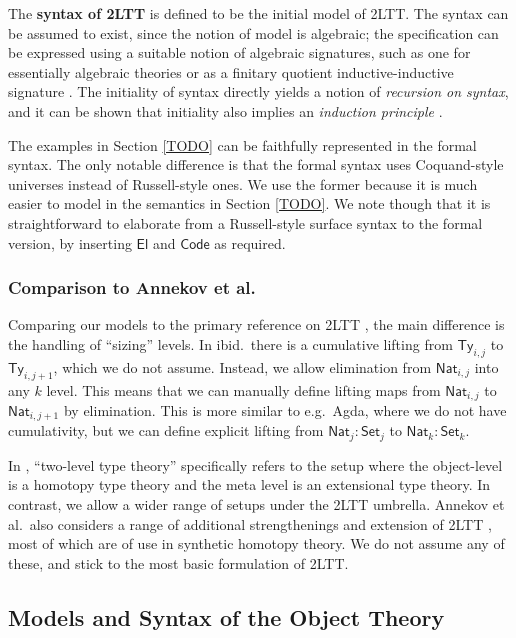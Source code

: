 \documentclass[acmsmall]{acmart}
\newcommand{\msf}[1]{\mathsf{#1}}
\newcommand{\Code}{\msf{Code}}
\newcommand{\El}{\msf{El}}
\newcommand{\Ty}{\msf{Ty}}
\newcommand{\Nat}{\msf{Nat}}
\newcommand{\Set}{\mathsf{Set}}
\theoremstyle{remark}
\begin{document}
\begin{definition}
The \textbf{syntax of 2LTT} is defined to be the initial model of 2LTT. The syntax
can be assumed to exist, since the notion of model is algebraic; the
specification can be expressed using a suitable notion of algebraic signatures,
such as one for essentially algebraic theories \cite{TODO} or as a finitary
quotient inductive-inductive signature \cite{TODO}. The initiality of syntax
directly yields a notion of \emph{recursion on syntax}, and it can be shown that
initiality also implies an \emph{induction principle} \cite{TODO}.
\end{definition}

The examples in Section \ref{TODO} can be faithfully represented in the formal
syntax. The only notable difference is that the formal syntax uses Coquand-style
universes instead of Russell-style ones. We use the former because it is much
easier to model in the semantics in Section \ref{TODO}. We note though that it
is straightforward to elaborate from a Russell-style surface syntax to the
formal version, by inserting $\El$ and $\Code$ as required.

\subsubsection{Comparison to Annekov et al.}
Comparing our models to the primary reference on 2LTT \cite{twolevel}, the main
difference is the handling of ``sizing'' levels. In ibid.\ there is a cumulative
lifting from $\Ty_{i,j}$ to $\Ty_{i,j+1}$, which we do not assume. Instead,
we allow elimination from $\Nat_{i,j}$ into any $k$ level. This means that we
can manually define lifting maps from $\Nat_{i,j}$ to $\Nat_{i,j+1}$ by
elimination. This is more similar to e.g.\ Agda, where we do not have cumulativity,
but we can define explicit lifting from $\Nat_j : \Set_j$ to $\Nat_k : \Set_k$.

In \cite{twolevel}, ``two-level type theory'' specifically refers to the setup
where the object-level is a homotopy type theory and the meta level is an
extensional type theory. In contrast, we allow a wider range of setups under the
2LTT umbrella. Annekov et al.\ also considers a range of additional
strengthenings and extension of 2LTT \cite[Section~2.4]{twolevel}, most of which
are of use in synthetic homotopy theory. We do not assume any of these, and
stick to the most basic formulation of 2LTT.

\subsection{Models and Syntax of the Object Theory}
\end{document}
